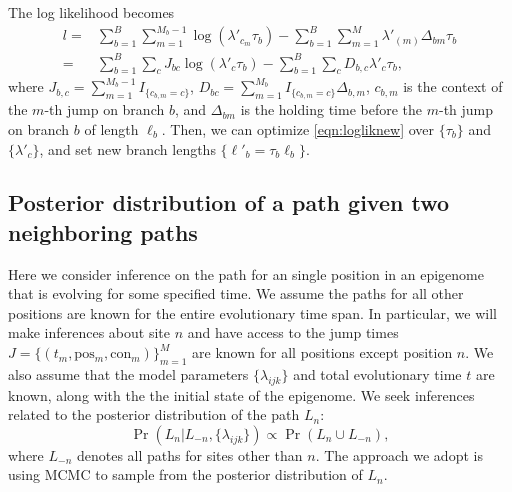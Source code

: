 \documentclass[11pt]{article}
\newcommand{\context}{\ensuremath{\mathrm{con}}}
\newcommand{\psn}{\ensuremath{\mathrm{pos}}}
\begin{document}
The log likelihood becomes
\begin{equation}\label{eqn:logliknew}
\begin{aligned}
l = & \sum\limits_{b=1}^B\sum\limits_{m=1}^{M_b-1} \log(\lambda'_{c_m}\tau_b) -  \sum\limits_{b=1}^B\sum\limits_{m=1}^{M} \lambda'_{(m)}\Delta_{bm}\tau_b \\
= & \sum\limits_{b=1}^B\sum_{c} J_{bc}\log(\lambda'_c\tau_b)  - \sum\limits_{b=1}^B\sum_{c} D_{b,c}\lambda'_c\tau_b ,
\end{aligned}
\end{equation}
where
$J_{b,c} = \sum\limits_{m=1}^{M_b-1}I_{\{c_{b,m}= c\}}$,
$D_{bc} = \sum\limits_{m=1}^{M_b}I_{\{c_{b,m} =c\}}\Delta_{b,m}$,
$c_{b,m}$ is the context of the $m$-th jump on branch $b$,
and $\Delta_{bm}$ is the holding time before the $m$-th jump on branch
$b$ of length $\ell_b$. Then, we can optimize \eqref{eqn:logliknew} over $\{\tau_b\}$
and $\{\lambda'_c\}$, and set new branch lengths $\{\ell'_b = \tau_b\ell_b\}$.



\subsection{Posterior distribution of a path given two neighboring paths}


Here we consider inference on the path for an single position in an
epigenome that is evolving for some specified time. We assume the
paths for all other positions are known for the entire evolutionary
time span. In particular, we will make inferences about site $n$ and
have access to the jump times $J = \{(t_m, \psn{}_m, \context{}_m)
\}_{m=1}^{M}$ are known for all positions except position $n$.
We also assume that the model parameters $\{\lambda_{ijk}\}$ and total
evolutionary time $t$ are known, along with the the initial state of
the epigenome. We seek inferences related to the posterior
distribution of the path $L_n$:
\[
\Pr(L_n|L_{-n}, \{\lambda_{ijk}\}) \propto \Pr(L_n\cup L_{-n}),
\]
where $L_{-n}$ denotes all paths for sites other than $n$. The
approach we adopt is using MCMC to sample from the posterior
distribution of $L_n$.
\end{document}
